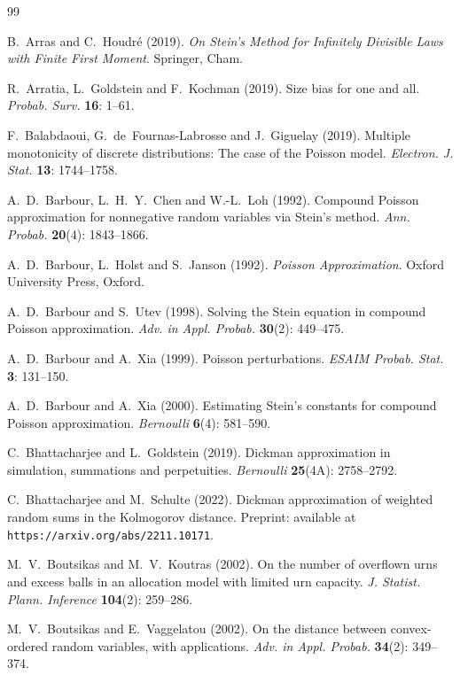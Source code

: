 \documentclass[12pt]{article}
\begin{document}
\begin{thebibliography}{99}

 B.~Arras and C.~Houdr\'e (2019). \emph{On Stein's Method for Infinitely Divisible Laws with Finite First Moment}. Springer, Cham.

 R.~Arratia, L.~Goldstein and F.~Kochman (2019). Size bias for one and all. \emph{Probab. Surv.} {\bf 16}: 1--61. 

 F.~Balabdaoui, G.~de~Fournas-Labrosse and J.~Giguelay (2019). Multiple monotonicity of discrete distributions: The case of the Poisson model. \emph{Electron. J. Stat.} {\bf 13}: 1744--1758.

 A.~D.~Barbour, L.~H.~Y.~Chen and W.-L.~Loh (1992). Compound Poisson approximation for nonnegative random variables via Stein's method. \emph{Ann. Probab.} {\bf 20}(4): 1843--1866. 

 A.~D.~Barbour, L.~Holst and S.~Janson (1992). \emph{Poisson Approximation}. Oxford University Press, Oxford.

 A.~D.~Barbour and S.~Utev (1998). Solving the Stein equation in compound Poisson approximation. \emph{Adv. in Appl. Probab.} {\bf 30}(2): 449--475.

 A.~D.~Barbour and A.~Xia (1999). Poisson perturbations. \emph{ESAIM Probab. Stat.} {\bf 3}: 131--150. 

 A.~D.~Barbour and A.~Xia (2000). Estimating Stein's constants for compound Poisson approximation. \emph{Bernoulli} {\bf 6}(4): 581--590. 

 C.~Bhattacharjee and L.~Goldstein (2019). Dickman approximation in simulation, summations and perpetuities. \emph{Bernoulli} {\bf 25}(4A): 2758--2792.

 C.~Bhattacharjee and M.~Schulte (2022). Dickman approximation of weighted random sums in the Kolmogorov distance. Preprint: available at \texttt{https://arxiv.org/abs/2211.10171}. 

 M.~V.~Boutsikas and M.~V.~Koutras (2002). On the number of overflown urns and excess balls in an allocation model with limited urn capacity. \emph{J. Statist. Plann. Inference} {\bf 104}(2): 259--286.

 M.~V.~Boutsikas and E.~Vaggelatou (2002). On the distance between convex-ordered random variables, with applications. \emph{Adv. in Appl. Probab.} {\bf 34}(2): 349--374.


\end{thebibliography}
\end{document}

